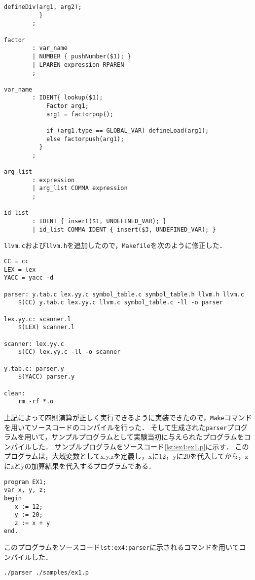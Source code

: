 \documentclass[uplatex]{jsarticle}
\begin{document}
\begin{lstlisting}[caption=構文規則部の処理,label=lst:ex4:parser.y:rules]
            defineDiv(arg1, arg2);
          }
        ;

factor
        : var_name
        | NUMBER { pushNumber($1); }
        | LPAREN expression RPAREN
        ;

var_name
        : IDENT{ lookup($1);
            Factor arg1;
            arg1 = factorpop();

            if (arg1.type == GLOBAL_VAR) defineLoad(arg1);
            else factorpush(arg1);
          }
        ;

arg_list
        : expression
        | arg_list COMMA expression
        ;

id_list
        : IDENT { insert($1, UNDEFINED_VAR); }
        | id_list COMMA IDENT { insert($3, UNDEFINED_VAR); }
\end{lstlisting}

\verb#llvm.c#および\verb#llvm.h#を追加したので，\verb#Makefile#を次のように修正した．
\begin{lstlisting}[caption=Makefile,label=lst:ex4:Makefile]
CC = cc
LEX = lex
YACC = yacc -d

parser: y.tab.c lex.yy.c symbol_table.c symbol_table.h llvm.h llvm.c
	$(CC) y.tab.c lex.yy.c llvm.c symbol_table.c -ll -o parser

lex.yy.c: scanner.l
	$(LEX) scanner.l

scanner: lex.yy.c
	$(CC) lex.yy.c -ll -o scanner

y.tab.c: parser.y
	$(YACC) parser.y

clean:
	rm -rf *.o
\end{lstlisting}

上記によって四則演算が正しく実行できるように実装できたので，\verb#Make#コマンドを用いてソースコードのコンパイルを行った．
そして生成された\verb#parser#プログラムを用いて，サンプルプログラムとして実験当初に与えられたプログラムをコンパイルした．
サンプルプログラムをソースコード\ref{lst:ex4:ex1.p}に示す．
このプログラムは，大域変数としてx,y,zを定義し，xに12，yに20を代入してから，zにzとyの加算結果を代入するプログラムである．

\begin{lstlisting}[caption=ex1.p,label=lst:ex4:ex1.p]
program EX1;
var x, y, z;
begin
   x := 12;
   y := 20;
   z := x + y
end.
\end{lstlisting}

このプログラムをソースコード\verb#lst:ex4:parser#に示されるコマンドを用いてコンパイルした．
\begin{lstlisting}[caption=parserコマンド,label=lst:ex4:parser]
./parser ./samples/ex1.p
\end{lstlisting}
\end{document}
